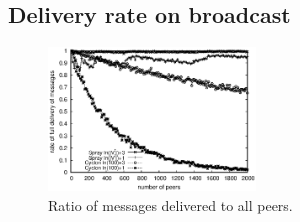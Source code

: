 

\subsection{Delivery rate on broadcast}

\begin{figure}
  \begin{center}
    \includegraphics[width=0.49\textwidth]{img/hardrate.eps}
    \caption{\label{fig:hardrate}Ratio of messages delivered to all peers.}
  \end{center}
\end{figure}

